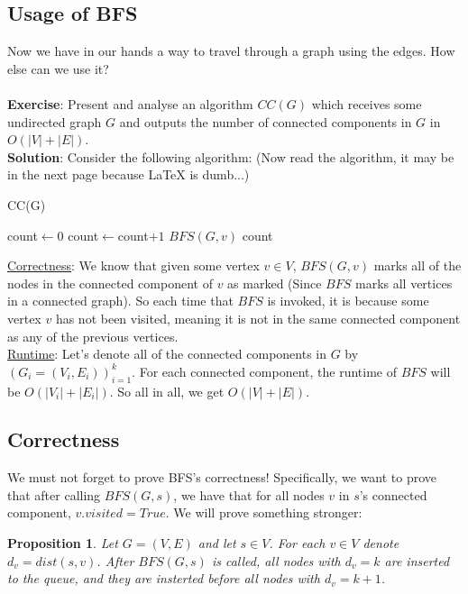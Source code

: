 \documentclass[12pt]{article}
\newtheorem{prop}{Proposition}
\begin{document}
\subsection{Usage of BFS}
Now we have in our hands a way to travel  through a graph using the edges. How else can we use it?\\ \\ 
\textbf{Exercise}: Present and analyse an algorithm $CC(G)$ which receives some undirected graph $G$ and outputs the number of connected components in $G$ in $O(|V|+|E|)$. \\

\textbf{Solution}: Consider the following algorithm: (Now read the algorithm, it may be in the next page because LaTeX is dumb...)
\begin{algorithm}
\caption{CC(G)}
\begin{algorithmic}[1]
\State count$\leftarrow 0$
\State count$\leftarrow$count$+1$
\State $BFS(G, v)$
\EndIf
\EndFor
\Return count
\end{algorithmic}
\end{algorithm}

\underline{Correctness}: We know that given some vertex $v\in V$, $BFS(G, v)$ marks all of the nodes in the connected component of $v$ as marked (Since $BFS$ marks all vertices in a connected graph). So each time that $BFS$ is invoked, it is because some vertex $v$ has not been visited, meaning it is not in the same connected component as any of the previous vertices. \\

\underline{Runtime}: Let's denote all of the connected components in $G$ by $(G_i=(V_i , E_i))_{i=1}^k$. For each connected component, the runtime of $BFS$ will be $O(|V_i|+|E_i|)$. So all in all, we get $O(|V|+|E|)$.

\subsection{Correctness}

We must not forget to prove BFS's correctness! Specifically, we want to prove that after calling $BFS(G, s)$, we have that for all nodes $v$ in $s$'s connected component, $v.visited = True$. We will prove something stronger:

\begin{prop}
Let $G=(V,E)$ and let $s\in V$. For each $v\in V$ denote $d_v=dist(s, v)$. 
After $BFS(G,s)$ is called, all nodes with $d_v=k$ are inserted to the queue, and they are insterted before all nodes with $d_v=k+1$.
\end{prop}
\end{document}
